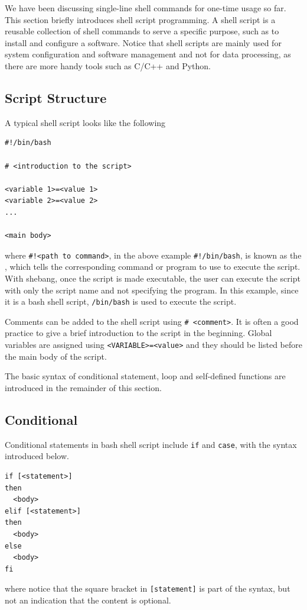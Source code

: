 We have been discussing single-line shell commands for one-time usage so far. This section briefly introduces shell script programming. A shell script is a reusable collection of shell commands to serve a specific purpose, such as to install and configure a software. Notice that shell scripts are mainly used for system configuration and software management and not for data processing, as there are more handy tools such as C/C++ and Python.

\subsection{Script Structure}

A typical shell script looks like the following
\begin{lstlisting}
#!/bin/bash

# <introduction to the script>

<variable 1>=<value 1>
<variable 2>=<value 2>
...

<main body>
\end{lstlisting}
where \verb|#!<path to command>|, in the above example \verb|#!/bin/bash|, is known as the , which tells the corresponding command or program to use to execute the script. With shebang, once the script is made executable, the user can execute the script with only the script name and not specifying the program. In this example, since it is a bash shell script, \verb|/bin/bash| is used to execute the script. 

Comments can be added to the shell script using \verb|# <comment>|. It is often a good practice to give a brief introduction to the script in the beginning. Global variables are assigned using \verb|<VARIABLE>=<value>| and they should be listed before the main body of the script.


The basic syntax of conditional statement, loop and self-defined functions are introduced in the remainder of this section.

\subsection{Conditional}

Conditional statements in bash shell script include \verb|if| and \verb|case|, with the syntax introduced below.

\begin{lstlisting}
if [<statement>]
then
  <body>
elif [<statement>]
then
  <body>
else
  <body>
fi
\end{lstlisting} 
where notice that the square bracket in \verb|[statement]| is part of the syntax, but not an indication that the content is optional.


